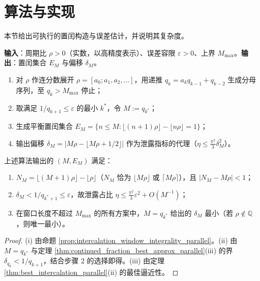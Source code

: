 \section{算法与实现}\label{sec:intercalation_algorithms}

本节给出可执行的置闰构造与误差估计，并说明其复杂度。

\begin{definition}[置闰窗构造算法]\label{def:intercalation_window_algorithm}
\textbf{输入}：周期比 $\rho>0$（实数，以高精度表示）、误差容限 $\varepsilon>0$、上界 $M_{\max}$。\textbf{输出}：置闰集合 $E_M$ 与偏移 $\delta_M$。
\begin{enumerate}[label=\textbf{步骤 \arabic*.}]
    \item 对 $\rho$ 作连分数展开 $\rho=[a_0;a_1,a_2,\dots]$，用递推 $q_k=a_kq_{k-1}+q_{k-2}$ 生成分母序列，至 $q_k>M_{\max}$ 停止；
    \item 取满足 $1/q_{k+1}\le\varepsilon$ 的最小 $k^\ast$，令 $M:=q_{k^\ast}$；
    \item 生成平衡置闰集合 $E_M=\{n\le M:\lfloor(n+1)\rho\rfloor-\lfloor n\rho\rfloor=1\}$；
    \item 输出偏移 $\delta_M=|M\rho-\lfloor M\rho+1/2\rfloor|$ 作为泄露指标的代理（$\eta\le\frac{\pi^2}{3}\delta_M^2$）。
\end{enumerate}
\end{definition}

\begin{theorem}[算法的正确性与最优性]\label{thm:algorithm_correctness}
上述算法输出的 $(M,E_M)$ 满足：
\begin{enumerate}[label=(\roman*)]
    \item $N_M=\lfloor(M+1)\rho\rfloor-\lfloor\rho\rfloor$（$N_M$ 恰为 $\lfloor M\rho\rfloor$ 或 $\lceil M\rho\rceil$），且 $\big|N_M-M\rho\big|<1$；
    \item $\delta_M<1/q_{k^\ast+1}\le\varepsilon$，故泄露占比 $\eta\le\frac{\pi^2}{3}\varepsilon^2+O(M^{-1})$；
    \item 在窗口长度不超过 $M_{\max}$ 的所有方案中，$M=q_{k^\ast}$ 给出的 $\delta_M$ 最小（若 $\rho\notin\mathbb{Q}$，则唯一最小）。
\end{enumerate}
\end{theorem}

\begin{proof}
(i) 由命题 \ref{prop:intercalation_window_integrality_parallel}。(ii) 由 $M=q_{k^\ast}$ 与定理 \ref{thm:continued_fraction_best_approx_parallel}(iii) 的界 $\delta_{q_k}<1/q_{k+1}$，结合步骤 2 的选择即得。(iii) 由定理 \ref{thm:best_intercalation_parallel}(ii) 的最佳逼近性。
\end{proof}

